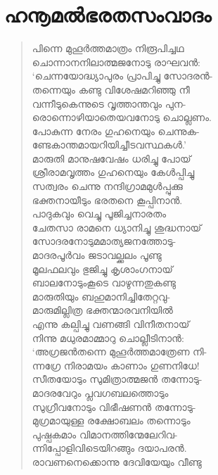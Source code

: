 
\section{ഹനൂമല്‍ഭരതസംവാദം}

\begin{verse}
പിന്നെ മുഹൂര്‍ത്തമാത്രം നിരൂപിച്ചഥ\\
ചൊന്നാനനിലാത്മജനോടു രാഘവന്‍:\\
‘ചെന്നയോദ്ധ്യാപുരം പ്രാപിച്ചു സോദരന്‍-\\
തന്നെയും കണ്ടു വിശേഷമറിഞ്ഞു നീ\\
വന്നീടുകെന്നുടെ വൃത്താന്തവും പുന-\\
രൊന്നൊഴിയാതെയവനോടു ചൊല്ലണം.\\
പോകുന്ന നേരം ഗുഹനെയും ചെന്നുക-\\
ണ്ടേകാന്തമായറിയിച്ചീടവസ്ഥകള്‍.’\\
മാരുതി മാനുഷവേഷം ധരിച്ചു പോയ്\\
ശ്രീരാമവൃത്തം ഗുഹനെയും കേള്‍പ്പിച്ചു\\
സത്വരം ചെന്നു നന്ദിഗ്രാമമുള്‍പ്പുക്കു\\
ഭക്തനായീടും ഭരതനെ കൂപ്പിനാന്‍.\\
പാദുകവും വെച്ചു പൂജിച്ചനാരതം\\
ചേതസാ രാമനെ ധ്യാനിച്ചു ശുദ്ധനായ്\\
സോദരനോടുമമാത്യജനത്തോടു-\\
മാദരപൂര്‍വം ജടാവല്ക്കലം പൂണ്ടു\\
മൂലഫലവും ഭുജിച്ചു കൃശാംഗനായ്\\
ബാലനോടുംകൂടെ വാഴുന്നതുകണ്ടു\\
മാരുതിയും ബഹുമാനിച്ചിതേറ്റവു-\\
മാരുമില്ലിത്ര ഭക്തന്മാരവനിയില്‍\\
എന്നു കല്പിച്ചു വണങ്ങി വിനീതനായ്\\
നിന്നു മധുരമാമ്മാറു ചൊല്ലീടിനാന്‍:\\
‘അഗ്രജന്‍തന്നെ മുഹൂര്‍ത്തമാത്രേണ നി-\\
ന്നഗ്രേ നിരാമയം കാണാം ഗുണനിധേ!\\
സീതയോടും സുമിത്രാത്മജന്‍ തന്നോടു-\\
മാദരവേറും പ്ലവഗബലത്തൊടും\\
സുഗ്രീവനോടും വിഭീഷണന്‍ തന്നോടു-\\
മുഗ്രമായുള്ള രക്ഷോബലം തന്നൊടും\\
പുഷ്പകമാം വിമാനത്തിന്മേലേറിവ-\\
ന്നിപ്പോളിവിടെയിറങ്ങും ദയാപരന്‍.\\
രാവണനെക്കൊന്നു ദേവിയേയും വീണ്ടു\\

\end{verse}
